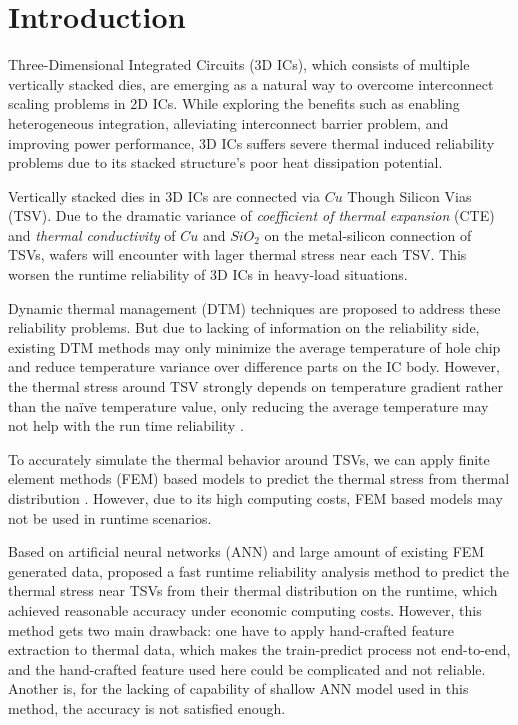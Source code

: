 
\chapter{Introduction}
Three-Dimensional Integrated Circuits (3D ICs),
which consists of multiple vertically stacked dies, 
are emerging as a natural way to overcome interconnect scaling problems in 2D ICs.
While exploring the benefits such as enabling heterogeneous integration, 
alleviating interconnect barrier problem, and improving power performance, 
3D ICs suffers severe thermal induced reliability problems due to its
stacked structure's poor heat dissipation potential.

Vertically stacked dies in 3D ICs are connected via $Cu$ Though Silicon Vias (TSV)\cite{Beyne2008Through}. 
Due to the dramatic variance of 
\textit{coefficient of thermal expansion} (CTE) and \textit{thermal conductivity}
of $Cu$ and $SiO_2$ on the metal-silicon connection of TSVs, 
wafers will encounter with lager thermal stress near each TSV.
This worsen the runtime reliability of 3D ICs in heavy-load situations.

Dynamic thermal management (DTM) techniques are proposed to address these reliability
problems. But due to lacking of information on the reliability side, existing DTM 
methods may only minimize the average temperature of hole chip and reduce temperature
variance over difference parts on the IC body\cite{Zou2013Thermomechanical}.
However, the thermal stress around TSV strongly depends on temperature gradient rather
than the na\"ive temperature value, only reducing the average temperature may not help with
the run time reliability \cite{Zhang2016Fast}.

To accurately simulate the thermal behavior around TSVs, we can apply finite element methods (FEM)
based models to predict the thermal stress from thermal distribution \cite{Lu2009Thermo}. 
However, due to its high computing costs, FEM based models may not be used in runtime scenarios.

Based on artificial neural networks (ANN) and large amount of existing FEM generated data, 
\cite{Zhang2016Fast} proposed a fast runtime reliability analysis method to predict the 
thermal stress near TSVs from their thermal distribution on the
runtime, which achieved reasonable accuracy under economic computing costs.
However, this method gets two main drawback: one have to apply hand-crafted feature extraction to
thermal data, which makes the train-predict process not end-to-end, and the hand-crafted feature used here
could be complicated and not reliable. Another is, 
for the lacking of capability of shallow ANN model used in this method, 
the accuracy is not satisfied enough.

